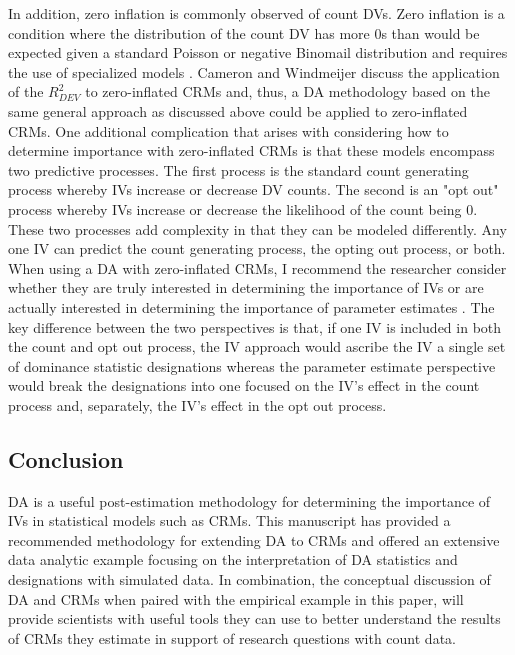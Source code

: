 \documentclass[man]{apa7}
\begin{document}
	In addition, zero inflation is commonly observed of count DVs.  
	Zero inflation is a condition where the distribution of the count DV has more 0s than would be expected given a standard Poisson or negative Binomail distribution and requires the use of specialized models \parencite[e.g.,][]{blevins2015count, bhaskar2023regression}. 
	Cameron and Windmeijer \parencite*{cameron1996r} discuss the application of the $R^2_{DEV}$ to zero-inflated CRMs and, thus, a DA methodology based on the same general approach as discussed above could be applied to zero-inflated CRMs.
	One additional complication that arises with considering how to determine importance with zero-inflated CRMs is that these models encompass two predictive processes. 
	The first process is the standard count generating process whereby IVs increase or decrease DV counts.
	The second is an "opt out" process whereby IVs increase or decrease the likelihood of the count being 0.
	These two processes add complexity in that they can be modeled differently. 
	Any one IV can predict the count generating process, the opting out process, or both.
	When using a DA with zero-inflated CRMs, I recommend the researcher consider whether they are truly interested in determining the importance of IVs or are actually interested in determining the importance of parameter estimates \parencite{luchman2020relative}. 
	The key difference between the two perspectives is that, if one IV is included in both the count and opt out process, the IV approach would ascribe the IV a single set of dominance statistic designations whereas the parameter estimate perspective would break the designations into one focused on the IV's effect in the count process and, separately, the IV's effect in the opt out process.
	
	\subsection{Conclusion}
	
	DA is a useful post-estimation methodology for determining the importance of IVs in statistical models such as CRMs.
	This manuscript has provided a recommended methodology for extending DA to CRMs and offered an extensive data analytic example focusing on the interpretation of DA statistics and designations with simulated data.
	In combination, the conceptual discussion of DA and CRMs when paired with the empirical example in this paper, will provide scientists with useful tools they can use to better understand the results of CRMs they estimate in support of research questions with count data.

\printbibliography
	
\end{document}
